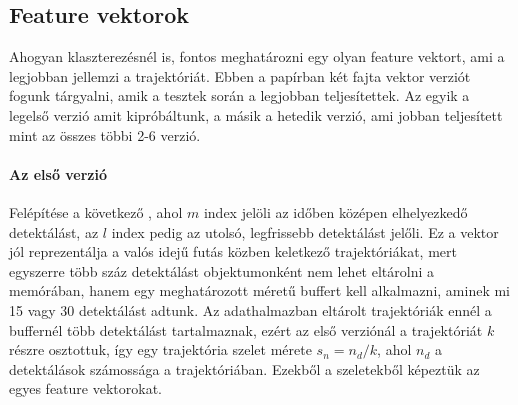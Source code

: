\documentclass[acmtog, authorversion]{acmart}
\begin{document}
\subsection{Feature vektorok}
Ahogyan klaszterezésnél is, fontos meghatározni egy olyan feature vektort, ami a legjobban jellemzi a trajektóriát. Ebben a papírban
két fajta vektor verziót fogunk tárgyalni, amik a tesztek során a legjobban teljesítettek. Az egyik a legelső verzió amit kipróbáltunk,
a másik a hetedik verzió, ami jobban teljesített mint az összes többi 2-6 verzió. 
\paragraph{Az első verzió} Felépítése a következő \begin{math}[x_0, y_0, v_{x_0}, v_{y_0}, x_m, y_m, x_l, y_l, v_{x_l}, v_{y_l}]\end{math}, ahol \begin{math}m\end{math}
index jelöli az időben középen elhelyezkedő detektálást, az \begin{math}l\end{math} index pedig az utolsó, legfrissebb detektálást jelőli.
Ez a vektor jól reprezentálja a valós idejű futás közben keletkező trajektóriákat, mert egyszerre több száz detektálást objektumonként
nem lehet eltárolni a memórában, hanem egy meghatározott méretű buffert kell alkalmazni, aminek mi 15 vagy 30 detektálást adtunk.
Az adathalmazban eltárolt trajektóriák ennél a buffernél több detektálást tartalmaznak, ezért az első verziónál a trajektóriát \begin{math}k\end{math} 
részre osztottuk, így egy trajektória szelet mérete \begin{math}s_n = n_d/k\end{math}, ahol \begin{math}n_d\end{math} a detektálások számossága
a trajektóriában. Ezekből a szeletekből képeztük az egyes feature vektorokat.
\end{document}
